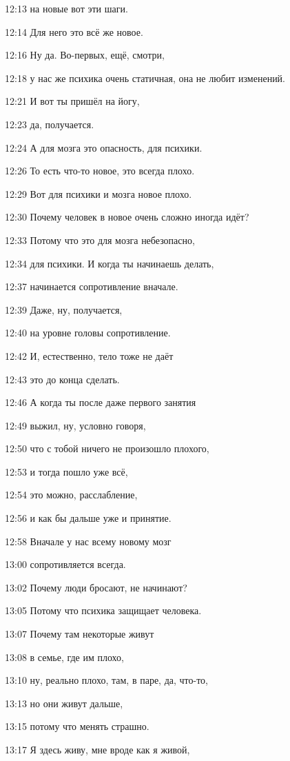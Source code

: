 12:13
на новые вот эти шаги.

12:14
Для него это всё же новое.

12:16
Ну да. Во-первых, ещё, смотри,

12:18
у нас же психика очень статичная, она не любит изменений.

12:21
И вот ты пришёл на йогу,

12:23
да, получается.

12:24
А для мозга это опасность, для психики.

12:26
То есть что-то новое, это всегда плохо.

12:29
Вот для психики и мозга новое плохо.

12:30
Почему человек в новое очень сложно иногда идёт?

12:33
Потому что это для мозга небезопасно,

12:34
для психики. И когда ты начинаешь делать,

12:37
начинается сопротивление вначале.

12:39
Даже, ну, получается,

12:40
на уровне головы сопротивление.

12:42
И, естественно, тело тоже не даёт

12:43
это до конца сделать.

12:46
А когда ты после даже первого занятия

12:49
выжил, ну, условно говоря,

12:50
что с тобой ничего не произошло плохого,

12:53
и тогда пошло уже всё,

12:54
это можно, расслабление,

12:56
и как бы дальше уже и принятие.

12:58
Вначале у нас всему новому мозг

13:00
сопротивляется всегда.

13:02
Почему люди бросают, не начинают?

13:05
Потому что психика защищает человека.

13:07
Почему там некоторые живут

13:08
в семье, где им плохо,

13:10
ну, реально плохо, там, в паре, да, что-то,

13:13
но они живут дальше,

13:15
потому что менять страшно.

13:17
Я здесь живу, мне вроде как я живой,

